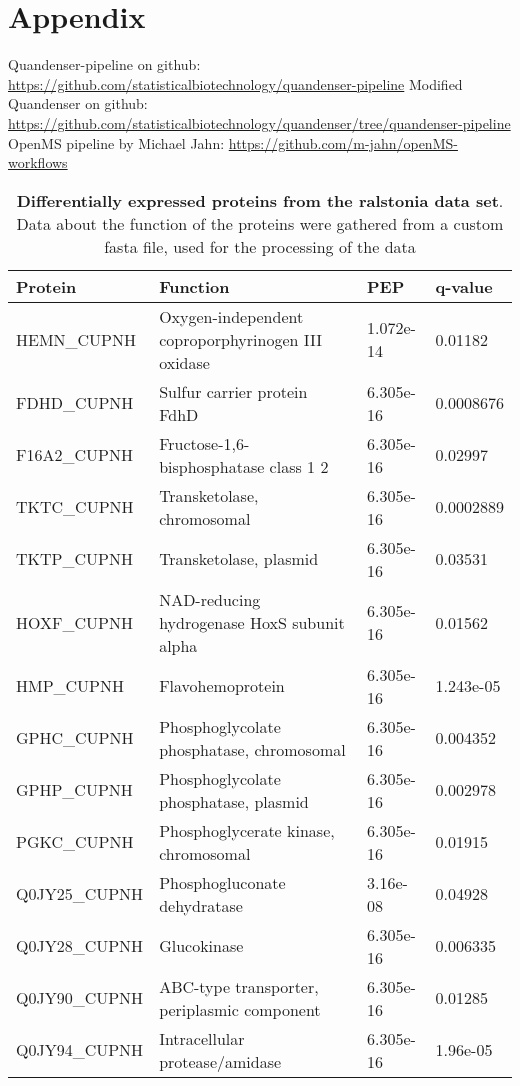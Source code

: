 \section{Appendix}

Quandenser-pipeline on github: \url{https://github.com/statisticalbiotechnology/quandenser-pipeline}
Modified Quandenser on github: \url{https://github.com/statisticalbiotechnology/quandenser/tree/quandenser-pipeline}
OpenMS pipeline by Michael Jahn: \url{https://github.com/m-jahn/openMS-workflows}


\begin{center}
\begin{longtable}{ l l l l }
\caption{\textbf{Differentially expressed proteins from the ralstonia data set}. Data about the function of the proteins were gathered from a custom fasta file, used for the processing of the data}\\
\toprule
Protein & Function & PEP & q-value \\\midrule
HEMN\_CUPNH & Oxygen-independent coproporphyrinogen III oxidase& 1.072e-14 & 0.01182 \\ [0.5ex]
FDHD\_CUPNH & Sulfur carrier protein FdhD& 6.305e-16 & 0.0008676 \\ [0.5ex]
F16A2\_CUPNH & Fructose-1,6-bisphosphatase class 1 2& 6.305e-16 & 0.02997 \\ [0.5ex]
TKTC\_CUPNH & Transketolase, chromosomal& 6.305e-16 & 0.0002889 \\ [0.5ex]
TKTP\_CUPNH & Transketolase, plasmid& 6.305e-16 & 0.03531 \\ [0.5ex]
HOXF\_CUPNH & NAD-reducing hydrogenase HoxS subunit alpha& 6.305e-16 & 0.01562 \\ [0.5ex]
HMP\_CUPNH & Flavohemoprotein& 6.305e-16 & 1.243e-05 \\ [0.5ex]
GPHC\_CUPNH & Phosphoglycolate phosphatase, chromosomal& 6.305e-16 & 0.004352 \\ [0.5ex]
GPHP\_CUPNH & Phosphoglycolate phosphatase, plasmid& 6.305e-16 & 0.002978 \\ [0.5ex]
PGKC\_CUPNH & Phosphoglycerate kinase, chromosomal& 6.305e-16 & 0.01915 \\ [0.5ex]
Q0JY25\_CUPNH & Phosphogluconate dehydratase& 3.16e-08 & 0.04928 \\ [0.5ex]
Q0JY28\_CUPNH & Glucokinase& 6.305e-16 & 0.006335 \\ [0.5ex]
Q0JY90\_CUPNH & ABC-type transporter, periplasmic component& 6.305e-16 & 0.01285 \\ [0.5ex]
Q0JY94\_CUPNH & Intracellular protease/amidase& 6.305e-16 & 1.96e-05 \\ [0.5ex]

\end{longtable}
\end{center}
